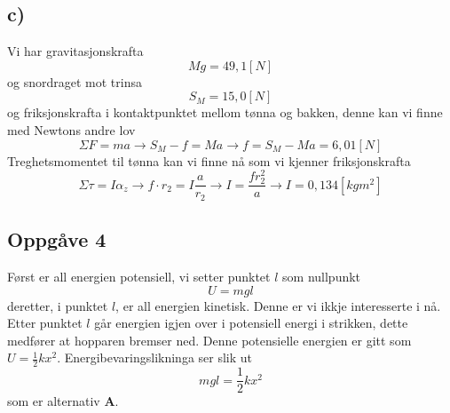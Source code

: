 \documentclass[12pt,a4paper]{article}
\begin{document}
    \subsection*{c)}
    Vi har gravitasjonskrafta
    \begin{equation}
      Mg = 49,1[N]
    \end{equation}
    og snordraget mot trinsa
    \begin{equation}
      S_M = 15,0[N]
    \end{equation}
    og friksjonskrafta i kontaktpunktet mellom tønna og bakken, denne kan vi finne med
    Newtons andre lov
    \begin{equation}
      \Sigma F = ma \longrightarrow S_M - f = Ma \rightarrow f = S_M - Ma = 6,01[N]
    \end{equation}
    Treghetsmomentet til tønna kan vi finne nå som vi kjenner friksjonskrafta
    \begin{equation}
      \Sigma \tau = I \alpha_z \rightarrow f\cdot r_2 = I \frac{a}{r_2} \rightarrow
      I = \frac{fr_2^2}{a} \rightarrow I = 0,134[kgm^2]
    \end{equation}


  \subsection*{Oppgåve 4}
    Først er all energien potensiell, vi setter punktet $l$ som nullpunkt
    \begin{equation}
      U = mgl
    \end{equation}
    deretter, i punktet $l$, er all energien kinetisk. Denne er vi ikkje
    interesserte i nå. Etter punktet $l$ går energien igjen over i potensiell
    energi i strikken, dette medfører at hopparen bremser ned. Denne
    potensielle energien er gitt som $U=\frac{1}{2}kx^2$.
    Energibevaringslikninga ser slik ut
    \begin{equation}
      mgl = \frac{1}{2}kx^2
    \end{equation}
    som er alternativ \textbf{A}.
\end{document}
